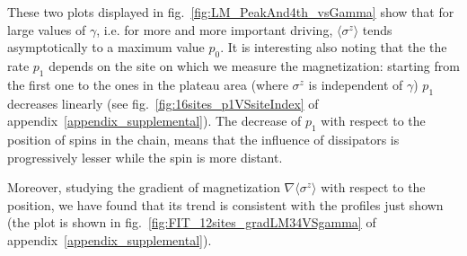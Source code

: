 These two plots displayed in fig.~\ref{fig:LM_PeakAnd4th_vsGamma} show that for large values of $\gamma$, i.e. for more and more important driving, $\langle\sigma^z\rangle$ tends asymptotically to a maximum value $p_0$. It is interesting also noting that the the rate $p_1$ depends on the site on which we measure the magnetization: starting from the first one to the ones in the plateau area (where $\sigma^z$ is independent of $\gamma$) $p_1$ decreases linearly (see fig.~\ref{fig:16sites_p1VSsiteIndex} of appendix~\ref{appendix_supplemental}). The decrease of $p_1$ with respect to the position of spins in the chain, means that the influence of dissipators is progressively lesser while the spin is more distant.

Moreover, studying the gradient of magnetization $\nabla \langle \sigma^z \rangle$ with respect to the position, we have found that its trend is consistent with the profiles just shown (the plot is shown in fig.~\ref{fig:FIT_12sites_gradLM34VSgamma} of appendix~\ref{appendix_supplemental}).





